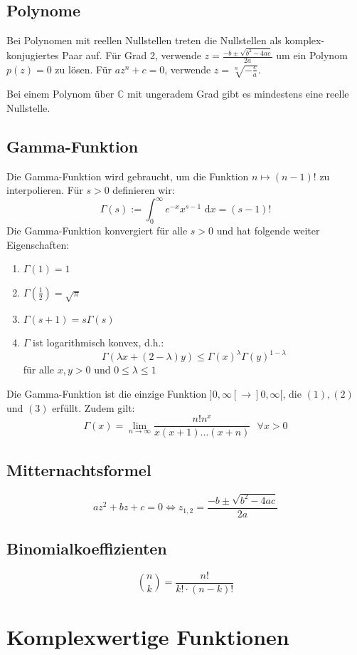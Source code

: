 \documentclass[a4paper,10pt]{article}
\def\limn{\lim_{n\to \infty}}
\def\dx{\text{ d}x}
\begin{document}
\subsection{Polynome}

Bei Polynomen mit reellen Nullstellen treten die Nullstellen als komplex-konjugiertes Paar auf. Für Grad 2, verwende $z = \frac{-b \pm \sqrt{b^2 - 4ac}}{2a}$ um ein Polynom $p(z) = 0$ zu lösen. Für $a z^n + c = 0$, verwende $z = \sqrt[n]{-\frac{c}{a}}$.

Bei einem Polynom über $\mathbb{C}$ mit ungeradem Grad gibt es mindestens eine reelle Nullstelle.

\subsection{Gamma-Funktion}
Die Gamma-Funktion wird gebraucht, um die Funktion $n \mapsto (n-1)!$ zu interpolieren. Für $s > 0$ definieren wir: $$\Gamma(s) := \int_0^\infty e^{-x}x^{s-1}\dx = (s-1)!$$
Die Gamma-Funktion konvergiert für alle $s > 0$ und hat folgende weiter Eigenschaften:
\begin{enumerate}
  \item $\Gamma(1) = 1$
  \item $\Gamma(\frac{1}{2}) = \sqrt{\pi}$
  \item $\Gamma(s + 1) = s \Gamma(s)$
  \item $\Gamma$ ist logarithmisch konvex, d.h.: $$\Gamma(\lambda x + (2 - \lambda)y) \leq \Gamma(x)^\lambda \Gamma(y)^{1 - \lambda}$$ für alle $x, y > 0$ und $0 \leq \lambda \leq 1$
\end{enumerate}
Die Gamma-Funktion ist die einzige Funktion $]0, \infty[ \to ]0, \infty[$, die $(1), (2)$ und $(3)$ erfüllt. Zudem gilt: $$\Gamma(x) = \limn \frac{n!n^x}{x(x+1)...(x+n)} \ \ \ \forall x > 0$$

\subsection{Mitternachtsformel}

$$
az^2 + bz + c = 0 \Leftrightarrow z_{1,2} = \frac{-b \pm \sqrt{b^2-4ac}}{2a}
$$

\subsection{Binomialkoeffizienten}

$$
\binom{n}{k}=\frac{n!}{k!\cdot(n-k)!}
$$

\section{Komplexwertige Funktionen}
\end{document}
